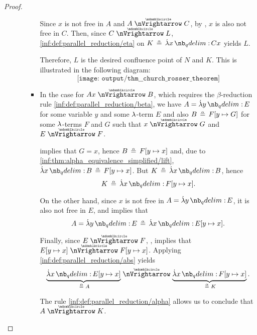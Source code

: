 \begin{proof}
\begin{itemize}
\begin{itemize}
\begin{itemize}
        Since \( x \) is not free in \( A \) and \( A \ppred C \), by , \( x \) is also not free in \( C \). Then, since \( C \ppred L \), \ref{inf:def:parallel_reduction/eta} on \( K \aequiv \qabs x C x \) yields \( L \).

        Therefore, \( L \) is the desired confluence point of \( N \) and \( K \). This is illustrated in the following diagram:
        \begin{equation*}
          \texttt{[image: output/thm\_\_church\_rosser\_theorem]}
        \end{equation*}

        \item In the case  for \( Ax \ppred B \), which requires the \( \beta \)-reduction rule \ref{inf:def:parallel_reduction/beta}, we have \( A = \qabs y E \) for some variable \( y \) and some \( {\mathrm \lambda} \)-term \( E \) and also \( B \aequiv F[y \mapsto G] \) for some \( {\mathrm \lambda} \)-terms \( F \) and \( G \) such that \( x \ppred G \) and \( E \ppred F \).

         implies that \( G = x \), hence \( B \aequiv F[y \mapsto x] \) and, due to \ref{inf:thm:alpha_equivalence_simplified/lift}, \( \qabs x B \aequiv F[y \mapsto x] \). But \( K \aequiv \qabs x B \), hence
        \begin{equation*}
          K \aequiv \qabs x F[y \mapsto x].
        \end{equation*}

        On the other hand, since \( x \) is not free in \( A = \qabs y E \), it is also not free in \( E \), and  implies that
        \begin{equation*}
          A = \qabs y E \aequiv \qabs x E[y \mapsto x].
        \end{equation*}

        Finally, since \( E \ppred F \), , implies that \( E[y \mapsto x] \ppred F[y \mapsto x] \). Applying \ref{inf:def:parallel_reduction/abs} yields
        \begin{equation*}
          \underbrace{\qabs x E[y \mapsto x]}_{\aequiv A} \ppred \underbrace{\qabs x F[y \mapsto x]}_{\aequiv K}.
        \end{equation*}

        The rule \ref{inf:def:parallel_reduction/alpha} allows us to conclude that \( A \ppred K \).


\end{itemize}
\end{itemize}
\end{itemize}
\end{proof}
